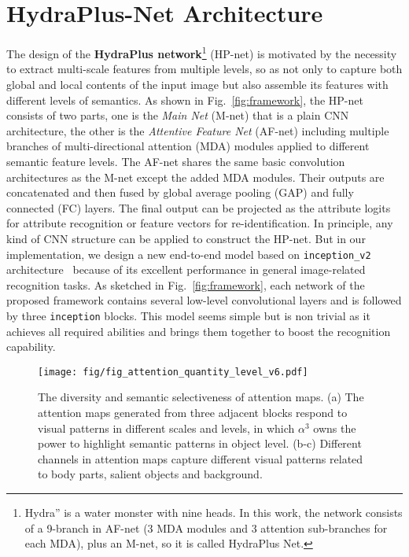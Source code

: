 \documentclass[10pt,twocolumn,letterpaper]{article}
\begin{document}
\section{HydraPlus-Net Architecture}
\label{sec:multi_attention}
\vspace{-0.1cm}
The design of the \textbf{HydraPlus network}\footnote{Hydra” is a water monster with nine heads. In this work, the network consists of a 9-branch in AF-net (3 MDA modules and 3 attention sub-branches for each MDA), plus an M-net, so it is called HydraPlus Net.} (HP-net) is motivated by the necessity to extract multi-scale features from multiple levels, so as not only to capture both global and local contents of the input image but also assemble its features with different levels of semantics.
As shown in Fig.~\ref{fig:framework}, the HP-net consists of two parts, one is the \textit{Main Net} (M-net) that is a plain CNN architecture, the other is the \textit{Attentive Feature Net} (AF-net) including multiple branches of multi-directional attention (MDA) modules applied to different semantic feature levels.
The AF-net shares the same basic convolution architectures as the M-net except the added MDA modules.
Their outputs are concatenated and then fused by global average pooling (GAP) and fully connected (FC) layers. The final output can be projected as the attribute logits for attribute recognition or feature vectors for re-identification.
In principle, any kind of CNN structure can be applied to construct the HP-net.
But in our implementation, we design a new end-to-end model based on \texttt{inception\_v2} architecture~\cite{ioffe2015batch} because of its excellent performance in general image-related recognition tasks.
As sketched in Fig.~\ref{fig:framework}, each network of the proposed framework contains several low-level convolutional layers and is followed by three \texttt{inception} blocks.
This model seems simple but is non trivial as it achieves all required abilities and brings them together to boost the recognition capability.


\begin{figure}[t]
\centering
\texttt{[image: fig/fig\_attention\_quantity\_level\_v6.pdf]}
\caption{The diversity and semantic selectiveness of attention maps. (a) The attention maps generated from three adjacent blocks respond to visual patterns in different scales and levels, in which $\alpha^3$ owns the power to highlight semantic patterns in object level. (b-c) Different channels in attention maps capture different visual patterns related to body parts, salient objects and background.
}
\label{fig:attention_level}
\end{figure}
\end{document}
